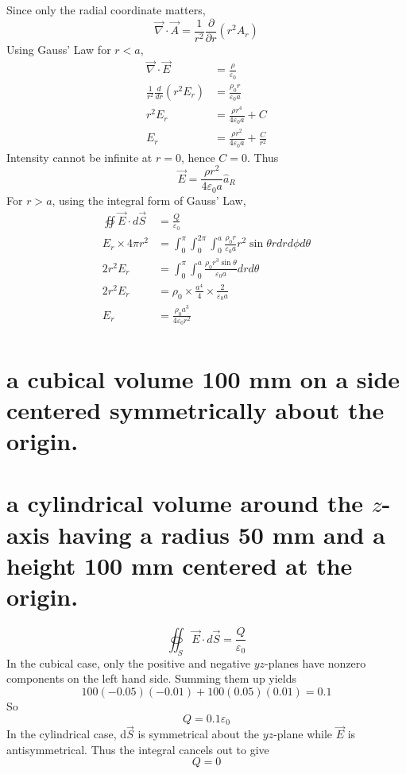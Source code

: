 \documentclass[answers]{exam}
\begin{document}
\begin{questions}
\begin{solution}
	Since only the radial coordinate matters,
	$$\vec{\nabla}\cdot\vec{A} = \frac{1}{r^2}\frac{\partial}{\partial r}\left(r^2A_r\right)$$
	Using Gauss' Law for $r<a$,
	\begin{align*}
		\vec{\nabla}\cdot\vec{E} &= \frac{\rho}{\varepsilon_0} \\
		\frac{1}{r^2}\frac{d}{dr}\left(r^2E_r\right) &= \frac{\rho_0r}{\varepsilon_0a} \\
		r^2E_r &= \frac{\rho r^4}{4\varepsilon_0a} + C \\
		E_r &= \frac{\rho r^2}{4\varepsilon_0a} + \frac{C}{r^2}
	\end{align*}
	Intensity cannot be infinite at $r=0$, hence $C=0$. Thus
	$$\vec{E} = \frac{\rho r^2}{4\varepsilon_0a}\hat{a}_R$$
	For $r>a$, using the integral form of Gauss' Law,
	\begin{align*}
		\oiint \vec{E}\cdot d\vec{S} &= \frac{Q}{\varepsilon_0} \\
		E_r\times4\pi r^2 &= \int_0^\pi\int_0^{2\pi}\int_0^a \frac{\rho_0r}{\varepsilon_0a}r^2\sin\theta rdrd\phi d\theta \\
		2r^2E_r &= \int_0^\pi\int_0^a \frac{\rho_0r^3\sin\theta}{\varepsilon_0a} drd\theta \\
		2r^2E_r &= \rho_0\times\frac{a^4}{4}\times\frac{2}{\varepsilon_0a} \\
		E_r &= \frac{\rho_0a^3}{4\varepsilon_0r^2} \\
	\end{align*}
\end{solution}


\begin{parts}
	\part{a cubical volume 100 mm on a side centered symmetrically about the origin.}
	\part{a cylindrical volume around the $z$-axis having a radius 50 mm and a height 100 mm centered at the origin.}
\end{parts}

\begin{solution}
	$$\oiint_S \vec{E}\cdot d\vec{S} = \frac{Q}{\varepsilon_0}$$
	In the cubical case, only the positive and negative $yz$-planes have nonzero components on the left hand side. Summing them up yields
	$$100(-0.05)(-0.01) + 100(0.05)(0.01) = 0.1$$
	So
	$$Q=0.1\varepsilon_0$$
	In the cylindrical case, d$\vec{S}$ is symmetrical about the $yz$-plane while $\vec{E}$ is antisymmetrical. Thus the integral cancels out to give
	$$Q=0$$
\end{solution}


\end{questions}
\end{document}
